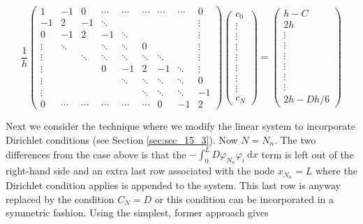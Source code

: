 \documentclass[../main.tex]{subfiles}
\begin{document}
	\begin{equation}
		\label{eqa191}
		\frac{1}{h}\left(\begin{array}{ccccccccc}
			1 & -1 & 0 & \cdots & \cdots & \cdots & \cdots & \cdots & 0 \\
			-1 & 2 & -1 & \ddots & & & & & \vdots \\
			0 & -1 & 2 & -1 & \ddots & & & & \vdots \\
			\vdots & \ddots & & \ddots & \ddots & 0 & & & \vdots \\
			\vdots & & \ddots & \ddots & \ddots & \ddots & \ddots & & \vdots \\
			\vdots & & & 0 & -1 & 2 & -1 & \ddots & \vdots \\
			\vdots & & & & \ddots & \ddots & \ddots & \ddots & 0 \\
			\vdots & & & & & \ddots & \ddots & \ddots & -1 \\
			0 & \cdots & \cdots & \cdots & \cdots & \cdots & 0 & -1 & 2
		\end{array}\right)\left(\begin{array}{c}
			c_{0} \\
			\vdots \\
			\vdots \\
			\vdots \\
			\vdots \\
			\vdots \\
			\vdots \\
			\vdots \\
			c_{N}
		\end{array}\right)=\left(\begin{array}{c}
			h-C \\
			2 h \\
			\vdots \\
			\vdots \\
			\vdots \\
			\vdots \\
			\vdots \\
			\vdots \\
			2h -Dh/6
		\end{array}\right)
	\end{equation}
		
		Next we consider the technique where we modify the linear system to incorporate Dirichlet conditions (see Section \ref{sec:sec_15_3}). Now $N=N_{n}$. The two differences from the case above is that the $-\int_{0}^{L} D \varphi_{N_{n}} \varphi_{i} \mathrm{~d} x$ term is left out of the right-hand side and an extra last row associated with the node $x_{N_{n}}=L$ where the Dirichlet condition applies is appended to the system. This last row is anyway replaced by the condition $C_{N}=D$ or this condition can be incorporated in a symmetric fashion. Using the simplest, former approach gives
		
\end{document}
